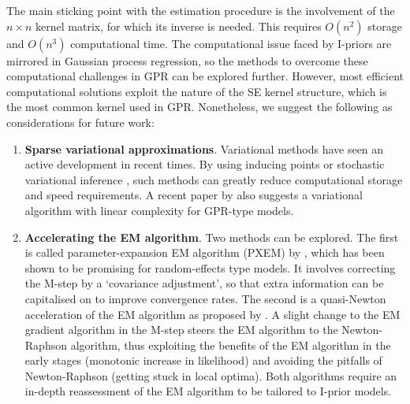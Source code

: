 \documentclass[a4paper,showframe,11pt]{report}
\begin{document}
The main sticking point with the estimation procedure is the involvement of the $n\times n$ kernel matrix, for which its inverse is needed.
This requires $O(n^2)$ storage and $O(n^3)$ computational time.
The computational issue faced by I-priors are mirrored in Gaussian process regression, so the methods to overcome these computational challenges in GPR can be explored further.
However, most efficient computational solutions exploit the nature of the SE kernel structure, which is the most common kernel used in GPR.
Nonetheless, we suggest the following as considerations for future work:
\begin{enumerate}
  \item \textbf{Sparse variational approximations}. Variational methods have seen an active development in recent times. By using inducing points \citep{titsias2009variational} or stochastic variational inference \citep{hensman2013gaussian}, such methods can greatly reduce computational storage and speed requirements. A recent paper by \citet{cheng2017variational} also suggests a variational algorithm with linear complexity for GPR-type models.
  \item \textbf{Accelerating the EM algorithm}. Two methods can be explored. The first is called parameter-expansion EM algorithm (PXEM) by \citep{liu1998parameter}, which has been shown to be promising for random-effects type models. It involves correcting the M-step by a `covariance adjustment', so that extra information can be capitalised on to improve convergence rates. The second is a quasi-Newton acceleration of the EM algorithm as proposed by \citet{lange1995quasi}. A slight change to the EM gradient algorithm in the M-step steers the EM algorithm to the Newton-Raphson algorithm, thus exploiting the benefits of the EM algorithm in the early stages (monotonic increase in likelihood) and avoiding the pitfalls of Newton-Raphson (getting stuck in local optima). Both algorithms require an in-depth reassessment of the EM algorithm to be tailored to I-prior models.
\end{enumerate}

\hClosingStuffStandalone
\end{document}
